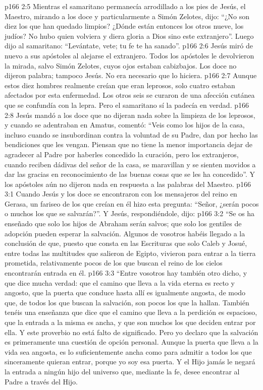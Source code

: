 \vs p166 2:5 Mientras el samaritano permanecía arrodillado a los pies de Jesús, el Maestro, mirando a los doce y particularmente a Simón Zelotes, dijo: “¿No son diez los que han quedado limpios? ¿Dónde están entonces los otros nueve, los judíos? No hubo quien volviera y diera gloria a Dios sino este extranjero”. Luego dijo al samaritano: “Levántate, vete; tu fe te ha sanado”.
\vs p166 2:6 Jesús miró de nuevo a sus apóstoles al alejarse el extranjero. Todos los apóstoles le devolvieron la mirada, salvo Simón Zelotes, cuyos ojos estaban cabizbajos. Los doce no dijeron palabra; tampoco Jesús. No era necesario que lo hiciera.
\vs p166 2:7 \pc Aunque estos diez hombres realmente creían que eran leprosos, solo cuatro estaban afectados por esta enfermedad. Los otros seis se curaron de una afección cutánea que se confundía con la lepra. Pero el samaritano sí la padecía en verdad.
\vs p166 2:8 \pc Jesús mandó a los doce que no dijeran nada sobre la limpieza de los leprosos, y cuando se adentraban en Amatus, comentó: “Veis como los hijos de la casa, incluso cuando se insubordinan contra la voluntad de su Padre, dan por hecho las bendiciones que les vengan. Piensan que no tiene la menor importancia dejar de agradecer al Padre por haberles concedido la curación, pero los extranjeros, cuando reciben dádivas del señor de la casa, se maravillan y se sienten movidos a dar las gracias en reconocimiento de las buenas cosas que se les ha concedido”. Y los apóstoles aún no dijeron nada en respuesta a las palabras del Maestro.
\vs p166 3:1 Cuando Jesús y los doce se encontraron con los mensajeros del reino en Gerasa, un fariseo de los que creían en él hizo esta pregunta: “Señor, ¿serán pocos o muchos los que se salvarán?”. Y Jesús, respondiéndole, dijo:
\vs p166 3:2 \pc “Se os ha enseñado que solo los hijos de Abraham serán salvos; que solo los gentiles de adopción pueden esperar la salvación. Algunos de vosotros habéis llegado a la conclusión de que, puesto que consta en las Escrituras que solo Caleb y Josué, entre todas las multitudes que salieron de Egipto, vivieron para entrar a la tierra prometida, relativamente pocos de los que buscan el reino de los cielos encontrarán entrada en él.
\vs p166 3:3 “Entre vosotros hay también otro dicho, y que dice mucha verdad: que el camino que lleva a la vida eterna es recto y angosto, que la puerta que conduce hasta allí es igualmente angosta, de modo que, de todos los que buscan la salvación, son pocos los que la hallan. También tenéis una enseñanza que dice que el camino que lleva a la perdición es espacioso, que la entrada a la misma es ancha, y que son muchos los que deciden entrar por ella. Y este proverbio no está falto de significado. Pero yo declaro que la salvación es primeramente una cuestión de opción personal. Aunque la puerta que lleva a la vida sea angosta, es lo suficientemente ancha como para admitir a todos los que sinceramente quieran entrar, porque yo soy esa puerta. Y el Hijo jamás le negará la entrada a ningún hijo del universo que, mediante la fe, desee encontrar al Padre a través del Hijo.
